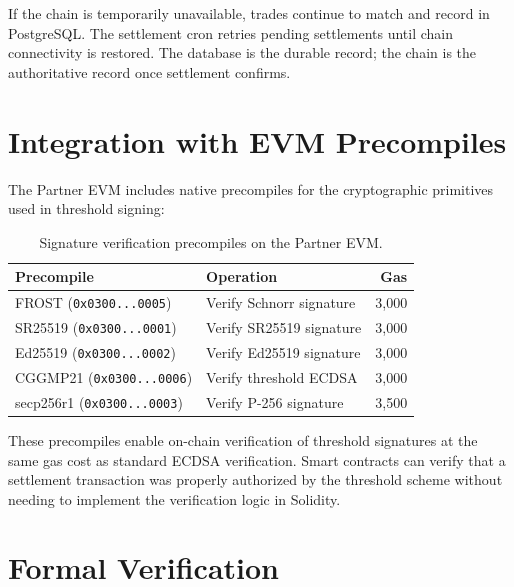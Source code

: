 \documentclass[11pt,a4paper]{article}
\begin{document}
If the chain is temporarily unavailable, trades continue to match and
record in PostgreSQL.  The settlement cron retries pending settlements
until chain connectivity is restored.  The database is the durable
record; the chain is the authoritative record once settlement confirms.

\section{Integration with EVM Precompiles}
\label{sec:precompiles}

The Partner EVM includes native precompiles for the cryptographic
primitives used in threshold signing:

\begin{table}[h]
\centering
\begin{tabular}{llr}
\toprule
\textbf{Precompile} & \textbf{Operation} & \textbf{Gas} \\
\midrule
FROST (\texttt{0x0300...0005}) & Verify Schnorr signature & 3,000 \\
SR25519 (\texttt{0x0300...0001}) & Verify SR25519 signature & 3,000 \\
Ed25519 (\texttt{0x0300...0002}) & Verify Ed25519 signature & 3,000 \\
CGGMP21 (\texttt{0x0300...0006}) & Verify threshold ECDSA & 3,000 \\
secp256r1 (\texttt{0x0300...0003}) & Verify P-256 signature & 3,500 \\
\bottomrule
\end{tabular}
\caption{Signature verification precompiles on the Partner EVM.}
\label{tab:precompiles}
\end{table}

These precompiles enable on-chain verification of threshold signatures
at the same gas cost as standard ECDSA verification.  Smart contracts
can verify that a settlement transaction was properly authorized by
the threshold scheme without needing to implement the verification
logic in Solidity.

\section{Formal Verification}
\label{sec:formal}
\end{document}

